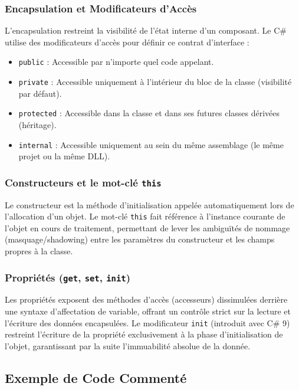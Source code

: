 \subsubsection{Encapsulation et Modificateurs d'Accès}

L'encapsulation restreint la visibilité de l'état interne d'un composant. Le C\# utilise des modificateurs d'accès pour définir ce contrat d'interface :
\begin{itemize}
    \item \texttt{public} : Accessible par n'importe quel code appelant.
    \item \texttt{private} : Accessible uniquement à l'intérieur du bloc de la classe (visibilité par défaut).
    \item \texttt{protected} : Accessible dans la classe et dans ses futures classes dérivées (héritage).
    \item \texttt{internal} : Accessible uniquement au sein du même assemblage (le même projet ou la même DLL).
\end{itemize}

\subsubsection{Constructeurs et le mot-clé \texttt{this}}

Le constructeur est la méthode d'initialisation appelée automatiquement lors de l'allocation d'un objet. Le mot-clé \texttt{this} fait référence à l'instance courante de l'objet en cours de traitement, permettant de lever les ambiguïtés de nommage (masquage/shadowing) entre les paramètres du constructeur et les champs propres à la classe.

\subsubsection{Propriétés (\texttt{get}, \texttt{set}, \texttt{init})}

Les propriétés exposent des méthodes d'accès (accesseurs) dissimulées derrière une syntaxe d'affectation de variable, offrant un contrôle strict sur la lecture et l'écriture des données encapsulées. Le modificateur \texttt{init} (introduit avec C\# 9) restreint l'écriture de la propriété exclusivement à la phase d'initialisation de l'objet, garantissant par la suite l'immuabilité absolue de la donnée.

\subsection{Exemple de Code Commenté}

